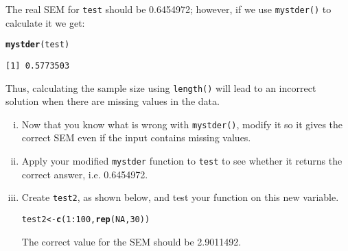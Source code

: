 \documentclass[12pt,a4paper]{article}\usepackage[]{graphicx}\usepackage[]{color}
\makeatletter
\newcommand{\hlnum}[1]{\textcolor[rgb]{0.686,0.059,0.569}{#1}}%
\newcommand{\hlopt}[1]{\textcolor[rgb]{0,0,0}{#1}}%
\newcommand{\hlstd}[1]{\textcolor[rgb]{0.345,0.345,0.345}{#1}}%
\newcommand{\hlkwb}[1]{\textcolor[rgb]{0.69,0.353,0.396}{#1}}%
\newcommand{\hlkwd}[1]{\textcolor[rgb]{0.737,0.353,0.396}{\textbf{#1}}}%
\newenvironment{kframe}{%
 \def\at@end@of@kframe{}%
 \ifinner\ifhmode%
  \def\at@end@of@kframe{\end{minipage}}%
  \begin{minipage}{\columnwidth}%
 \fi\fi%
 \def\FrameCommand##1{\hskip\@totalleftmargin \hskip-\fboxsep
 \colorbox{shadecolor}{##1}\hskip-\fboxsep
     \hskip-\linewidth \hskip-\@totalleftmargin \hskip\columnwidth}%
 \MakeFramed {\advance\hsize-\width
   \@totalleftmargin\z@ \linewidth\hsize
   \@setminipage}}%
 {\par\unskip\endMakeFramed%
 \at@end@of@kframe}
\newenvironment{knitrout}{}{} %
\makeatother
\begin{document}
The real SEM for \texttt{test} should be 0.6454972; however, if we use \texttt{mystder()} to calculate it we get:
\begin{knitrout}
\color{fgcolor}\begin{kframe}
\begin{alltt}
\hlkwd{mystder}\hlstd{(test)}
\end{alltt}
\begin{verbatim}
[1] 0.5773503
\end{verbatim}
\end{kframe}
\end{knitrout}

Thus, calculating the sample size using \texttt{length()} will lead to an incorrect solution when there are missing values in the data. 
\begin{enumerate}[(i)] 
\item Now that you know what is wrong with \texttt{mystder()}, modify it so it gives the correct SEM even if the input contains missing values.  
 
\item Apply your modified \texttt{mystder} function to \texttt{test} to see whether it returns the correct answer, i.e. 0.6454972.
 
\item Create \texttt{test2}, as shown below, and test your function on this new variable.

\begin{knitrout}
\color{fgcolor}\begin{kframe}
\begin{alltt}
\hlstd{test2} \hlkwb{<-} \hlkwd{c}\hlstd{(}\hlnum{1}\hlopt{:}\hlnum{100}\hlstd{,} \hlkwd{rep}\hlstd{(}\hlnum{NA}\hlstd{,} \hlnum{30}\hlstd{))}
\end{alltt}
\end{kframe}
\end{knitrout}
The correct value for the SEM should be 2.9011492.

\end{enumerate}
\end{document}
